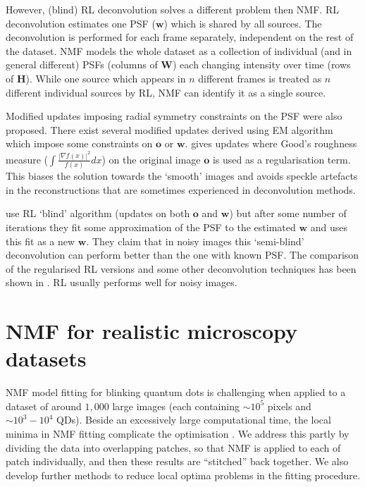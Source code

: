 However, (blind) RL deconvolution solves a different problem then NMF. RL deconvolution estimates one PSF ($\bm{w}$) which is shared by all sources. The deconvolution is performed for each frame separately, independent on the rest of the dataset. NMF models the whole dataset as a collection of individual (and in general different) PSFs (columns of $\bm{W}$) each changing intensity over time (rows of $\bm{H}$). While one source which appears in $n$ different frames is treated as $n$ different individual sources by RL, NMF can identify it as a single source. 

Modified updates imposing radial symmetry constraints on the PSF were also proposed. There exist several modified updates derived using EM algorithm which impose some constraints on $\bm{o}$ or $\bm{w}$. \cite{Joshi:93} gives updates where Good's roughness measure ($\int\frac{\left|\nabla f(x)\right|^{2}}{f(x)}dx$) on the original image $\bm{o}$ is used as a regularisation term. This biases the solution towards the `smooth' images and avoids speckle artefacts in the reconstructions that are sometimes experienced in deconvolution methods. 

\cite{Fish:95} use RL `blind' algorithm (updates on both $\bm{o}$ and $\bm{w}$) but after some number of iterations they fit some approximation of the PSF to the estimated $\bm{w}$ and uses this fit as a new $\bm{w}$. They claim that in noisy images this `semi-blind' deconvolution can perform better than the one with known PSF. The comparison of the regularised RL versions and some other deconvolution techniques has been shown in \cite{Kempen1997BA,Verveer1999}. RL usually performs well for noisy images.


\clearpage
\section{NMF for realistic microscopy datasets \label{sec:NMF-for-real}}

NMF model fitting for blinking quantum dots is challenging when applied to a dataset of around $1,000$ large images (each containing $\sim 10^{5}$ pixels and $\sim10^{3}-10^{4}$ QDs). Beside an excessively large computational time, the local minima in NMF fitting complicate the optimisation \cite{Kim2008}. We address this partly by dividing the data into overlapping patches, so that NMF is applied to each of patch individually, and then these results are ``stitched'' back together. We also develop further methods to reduce local optima problems in the fitting procedure. 

